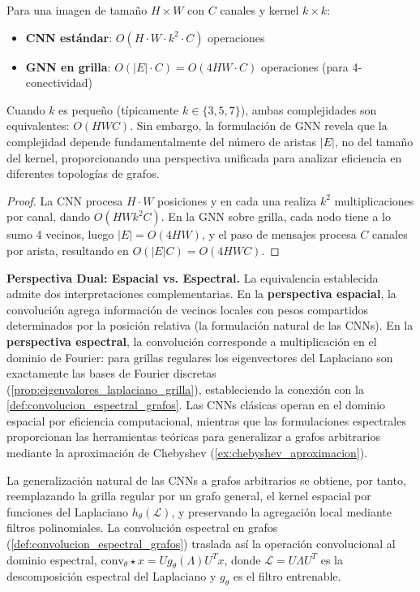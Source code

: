 \begin{proposition}\label{prop:complejidad_cnn_vs_gnn_grilla}
Para una imagen de tamaño $H \times W$ con $C$ canales y kernel $k \times k$:
\begin{itemize}
    \item \textbf{CNN estándar}: $O(H \cdot W \cdot k^2 \cdot C)$ operaciones
    \item \textbf{GNN en grilla}: $O(|E| \cdot C) = O(4HW \cdot C)$ operaciones (para 4-conectividad)
\end{itemize}
Cuando $k$ es pequeño (típicamente $k \in \{3, 5, 7\}$), ambas complejidades son equivalentes: $O(HWC)$. Sin embargo, la formulación de GNN revela que la complejidad depende fundamentalmente del número de aristas $|E|$, no del tamaño del kernel, proporcionando una perspectiva unificada para analizar eficiencia en diferentes topologías de grafos.
\end{proposition}

\begin{proof}
La CNN procesa $H \cdot W$ posiciones y en cada una realiza $k^2$ multiplicaciones por canal, dando $O(H W k^2 C)$. En la GNN sobre grilla, cada nodo tiene a lo sumo 4 vecinos, luego $|E| = O(4HW)$, y el paso de mensajes procesa $C$ canales por arista, resultando en $O(|E| C) = O(4HW C)$.
\end{proof}

\textbf{Perspectiva Dual: Espacial vs. Espectral.} La equivalencia establecida admite dos interpretaciones complementarias. En la \textbf{perspectiva espacial}, la convolución agrega información de vecinos locales con pesos compartidos determinados por la posición relativa (la formulación natural de las CNNs). En la \textbf{perspectiva espectral}, la convolución corresponde a multiplicación en el dominio de Fourier: para grillas regulares los eigenvectores del Laplaciano son exactamente las bases de Fourier discretas (\autoref{prop:eigenvalores_laplaciano_grilla}), estableciendo la conexión con la \autoref{def:convolucion_espectral_grafos}. Las CNNs clásicas operan en el dominio espacial por eficiencia computacional, mientras que las formulaciones espectrales proporcionan las herramientas teóricas para generalizar a grafos arbitrarios mediante la aproximación de Chebyshev (\autoref{ex:chebyshev_aproximacion}).

La generalización natural de las CNNs a grafos arbitrarios se obtiene, por tanto, reemplazando la grilla regular por un grafo general, el kernel espacial por funciones del Laplaciano $h_\theta(\mathcal{L})$, y preservando la agregación local mediante filtros polinomiales. La convolución espectral en grafos (\autoref{def:convolucion_espectral_grafos}) traslada así la operación convolucional al dominio espectral, $\text{conv}_\theta \star x = U g_\theta(\Lambda) U^T x$, donde $\mathcal{L} = U\Lambda U^T$ es la descomposición espectral del Laplaciano y $g_\theta$ es el filtro entrenable.

